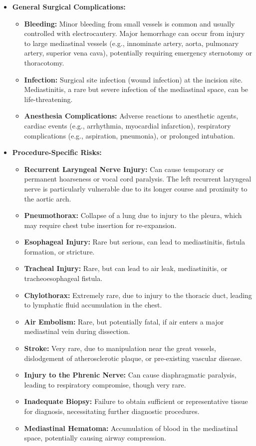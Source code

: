 \begin{itemize}
  \item \textbf{General Surgical Complications:}
    \begin{itemize}
      \item \textbf{Bleeding:} Minor bleeding from small vessels is common and usually controlled with electrocautery. Major hemorrhage can occur from injury to large mediastinal vessels (e.g., innominate artery, aorta, pulmonary artery, superior vena cava), potentially requiring emergency sternotomy or thoracotomy.
      \item \textbf{Infection:} Surgical site infection (wound infection) at the incision site. Mediastinitis, a rare but severe infection of the mediastinal space, can be life-threatening.
      \item \textbf{Anesthesia Complications:} Adverse reactions to anesthetic agents, cardiac events (e.g., arrhythmia, myocardial infarction), respiratory complications (e.g., aspiration, pneumonia), or prolonged intubation.
    \end{itemize}
  \item \textbf{Procedure-Specific Risks:}
    \begin{itemize}
      \item \textbf{Recurrent Laryngeal Nerve Injury:} Can cause temporary or permanent hoarseness or vocal cord paralysis. The left recurrent laryngeal nerve is particularly vulnerable due to its longer course and proximity to the aortic arch.
      \item \textbf{Pneumothorax:} Collapse of a lung due to injury to the pleura, which may require chest tube insertion for re-expansion.
      \item \textbf{Esophageal Injury:} Rare but serious, can lead to mediastinitis, fistula formation, or stricture.
      \item \textbf{Tracheal Injury:} Rare, but can lead to air leak, mediastinitis, or tracheoesophageal fistula.
      \item \textbf{Chylothorax:} Extremely rare, due to injury to the thoracic duct, leading to lymphatic fluid accumulation in the chest.
      \item \textbf{Air Embolism:} Rare, but potentially fatal, if air enters a major mediastinal vein during dissection.
      \item \textbf{Stroke:} Very rare, due to manipulation near the great vessels, dislodgement of atherosclerotic plaque, or pre-existing vascular disease.
      \item \textbf{Injury to the Phrenic Nerve:} Can cause diaphragmatic paralysis, leading to respiratory compromise, though very rare.
      \item \textbf{Inadequate Biopsy:} Failure to obtain sufficient or representative tissue for diagnosis, necessitating further diagnostic procedures.
      \item \textbf{Mediastinal Hematoma:} Accumulation of blood in the mediastinal space, potentially causing airway compression.
    \end{itemize}
\end{itemize}

